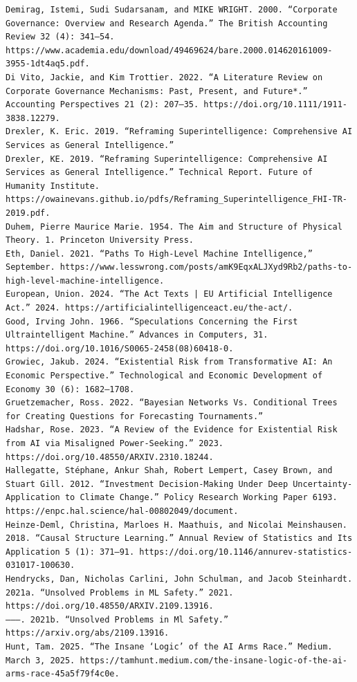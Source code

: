 \documentclass[
  11pt,
  letterpaper,
]{book}
\begin{document}
\begin{verbatim}
Demirag, Istemi, Sudi Sudarsanam, and MIKE WRIGHT. 2000. “Corporate Governance: Overview and Research Agenda.” The British Accounting Review 32 (4): 341–54. https://www.academia.edu/download/49469624/bare.2000.014620161009-3955-1dt4aq5.pdf.
Di Vito, Jackie, and Kim Trottier. 2022. “A Literature Review on Corporate Governance Mechanisms: Past, Present, and Future*.” Accounting Perspectives 21 (2): 207–35. https://doi.org/10.1111/1911-3838.12279.
Drexler, K. Eric. 2019. “Reframing Superintelligence: Comprehensive AI Services as General Intelligence.”
Drexler, KE. 2019. “Reframing Superintelligence: Comprehensive AI Services as General Intelligence.” Technical Report. Future of Humanity Institute. https://owainevans.github.io/pdfs/Reframing_Superintelligence_FHI-TR-2019.pdf.
Duhem, Pierre Maurice Marie. 1954. The Aim and Structure of Physical Theory. 1. Princeton University Press.
Eth, Daniel. 2021. “Paths To High-Level Machine Intelligence,” September. https://www.lesswrong.com/posts/amK9EqxALJXyd9Rb2/paths-to-high-level-machine-intelligence.
European, Union. 2024. “The Act Texts | EU Artificial Intelligence Act.” 2024. https://artificialintelligenceact.eu/the-act/.
Good, Irving John. 1966. “Speculations Concerning the First Ultraintelligent Machine.” Advances in Computers, 31. https://doi.org/10.1016/S0065-2458(08)60418-0.
Growiec, Jakub. 2024. “Existential Risk from Transformative AI: An Economic Perspective.” Technological and Economic Development of Economy 30 (6): 1682–1708.
Gruetzemacher, Ross. 2022. “Bayesian Networks Vs. Conditional Trees for Creating Questions for Forecasting Tournaments.”
Hadshar, Rose. 2023. “A Review of the Evidence for Existential Risk from AI via Misaligned Power-Seeking.” 2023. https://doi.org/10.48550/ARXIV.2310.18244.
Hallegatte, Stéphane, Ankur Shah, Robert Lempert, Casey Brown, and Stuart Gill. 2012. “Investment Decision-Making Under Deep Uncertainty-Application to Climate Change.” Policy Research Working Paper 6193. https://enpc.hal.science/hal-00802049/document.
Heinze-Deml, Christina, Marloes H. Maathuis, and Nicolai Meinshausen. 2018. “Causal Structure Learning.” Annual Review of Statistics and Its Application 5 (1): 371–91. https://doi.org/10.1146/annurev-statistics-031017-100630.
Hendrycks, Dan, Nicholas Carlini, John Schulman, and Jacob Steinhardt. 2021a. “Unsolved Problems in ML Safety.” 2021. https://doi.org/10.48550/ARXIV.2109.13916.
———. 2021b. “Unsolved Problems in Ml Safety.” https://arxiv.org/abs/2109.13916.
Hunt, Tam. 2025. “The Insane ‘Logic’ of the AI Arms Race.” Medium. March 3, 2025. https://tamhunt.medium.com/the-insane-logic-of-the-ai-arms-race-45a5f79f4c0e.

\end{verbatim}
\end{document}
